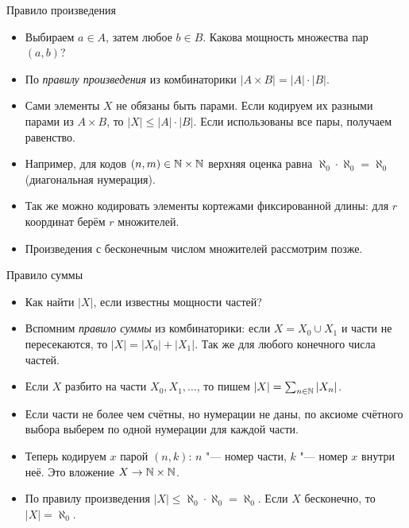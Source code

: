 \documentclass[10pt]{beamer}
\begin{document}
\begin{frame}{Правило произведения}
    \begin{itemize}
        \item Выбираем $a\in A$, затем любое $b\in B$. Какова мощность множества пар $(a,b)$?
        \item<2-> По \emph{правилу произведения} из комбинаторики $|A\times B|=|A|\cdot|B|$.
        \item<3-> Сами элементы $X$ не обязаны быть парами. Если кодируем их разными парами из $A\times B$, то $|X|\leq|A|\cdot|B|$. Если использованы все пары, получаем равенство.
        \item<4-> Например, для кодов $(n,m)\in\mathbb{N}\times\mathbb{N}$ верхняя оценка равна $\aleph_0\cdot\aleph_0=\aleph_0$ (диагональная нумерация).
        \item<5-> Так же можно кодировать элементы кортежами фиксированной длины: для $r$ координат берём $r$ множителей.
        \item<6-> Произведения с бесконечным числом множителей рассмотрим позже.
    \end{itemize}
\end{frame}

\begin{frame}{Правило суммы}
    \begin{itemize}
        \item Как найти $|X|$, если известны мощности частей?
        \item<2-> Вспомним \emph{правило суммы} из комбинаторики: если $X=X_0\cup X_1$ и части не пересекаются, то $|X|=|X_0|+|X_1|$. Так же для любого конечного числа частей.
        \item<3-> Если $X$ разбито на части $X_0,X_1,\ldots$, то пишем $|X|=\sum_{n\in\mathbb{N}}|X_n|$.
        \item<4-> Если части не более чем счётны, но нумерации не даны, по аксиоме счётного выбора выберем по одной нумерации для каждой части.
        \item<5-> Теперь кодируем $x$ парой $(n,k)$: $n$ "--- номер части, $k$ "--- номер $x$ внутри неё. Это вложение $X\to\mathbb{N}\times\mathbb{N}$.
        \item<6-> По правилу произведения $|X|\leq\aleph_0\cdot\aleph_0=\aleph_0$. Если $X$ бесконечно, то $|X|=\aleph_0$.
    \end{itemize}
\end{frame}
\end{document}
